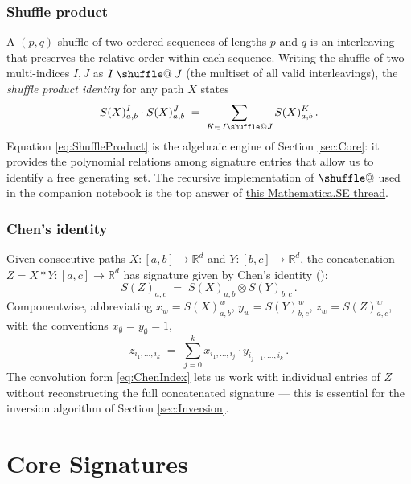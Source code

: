 \documentclass[12pt,english]{article}
\makeatletter
\providecommand*{\shuffle}{\mathbin{\mathpalette\shuffle@{}}}
\newcommand*{\shuffle@}[2]{%
  \sbox0{$#1\vcenter{}$}%
  \kern .15\ht0
  \rlap{\vrule height .25\ht0 depth 0pt width 2.5\ht0}%
  \raise.1\ht0\hbox to 2.5\ht0{%
    \vrule height 1.75\ht0 depth -.1\ht0 width .17\ht0
    \hfill
    \vrule height 1.75\ht0 depth -.1\ht0 width .17\ht0
    \hfill
    \vrule height 1.75\ht0 depth -.1\ht0 width .17\ht0}%
  \kern .15\ht0
}
\theoremstyle{remark}
\makeatother
\begin{document}
\subsubsection{Shuffle product}

A $(p,q)$-shuffle of two ordered sequences of lengths $p$ and $q$
is an interleaving that preserves the relative order within each sequence.
Writing the shuffle of two multi-indices $I,J$ as $I\shuffle J$
(the multiset of all valid interleavings), the \emph{shuffle product
identity} for any path $X$ states
\begin{equation}
S(X)_{a,b}^{I}\cdot S(X)_{a,b}^{J}\;=\;\sum_{K\in\,I\shuffle J}S(X)_{a,b}^{K}\,.\label{eq:ShuffleProduct}
\end{equation}
Equation \eqref{eq:ShuffleProduct} is the algebraic engine of Section
\ref{sec:Core}: it provides the polynomial relations among signature
entries that allow us to identify a free generating set. The recursive
implementation of $\shuffle$ used in the companion notebook is the
top answer of \href{https://mathematica.stackexchange.com/questions/41614/shuffle-product-of-two-lists}{this Mathematica.SE thread}.

\subsubsection{Chen's identity\label{subsec:ChenIdentity}}

Given consecutive paths $X:[a,b]\to\mathbb{R}^{d}$ and $Y:[b,c]\to\mathbb{R}^{d}$,
the concatenation $Z=X*Y:[a,c]\to\mathbb{R}^{d}$ has signature given
by Chen's identity (\cite{Lyons}):
\begin{equation}
S(Z)_{a,c}\;=\;S(X)_{a,b}\otimes S(Y)_{b,c}\,.\label{eq:ChenIdentity}
\end{equation}
Componentwise, abbreviating $x_{w}=S(X)_{a,b}^{w}$, $y_{w}=S(Y)_{b,c}^{w}$,
$z_{w}=S(Z)_{a,c}^{w}$, with the conventions $x_{\emptyset}=y_{\emptyset}=1$,
\begin{equation}
z_{i_{1},\ldots,i_{k}}\;=\;\sum_{j=0}^{k}x_{i_{1},\ldots,i_{j}}\cdot y_{i_{j+1},\ldots,i_{k}}\,.\label{eq:ChenIndex}
\end{equation}
The convolution form \eqref{eq:ChenIndex} lets us work with individual
entries of $Z$ without reconstructing the full concatenated signature
--- this is essential for the inversion algorithm of Section \ref{sec:Inversion}.

\section{Core Signatures\label{sec:Core}}
\end{document}
